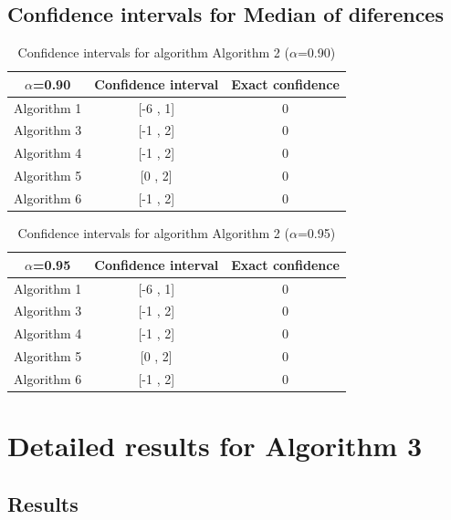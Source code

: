 \documentclass[a4paper,10pt]{article}
\begin{document}
\subsection{Confidence intervals for Median of diferences}

\begin{table}[!htp]
\centering\small
\begin{tabular}{
|c|c|c|}
\hline
 $\alpha$=0.90 & Confidence interval & Exact confidence \\ \hline 
Algorithm 1 & [-6 , 1] & 0\\ \hline 
Algorithm 3 & [-1 , 2] & 0\\ \hline 
Algorithm 4 & [-1 , 2] & 0\\ \hline 
Algorithm 5 & [0 , 2] & 0\\ \hline 
Algorithm 6 & [-1 , 2] & 0\\ \hline 

\end{tabular}
\caption{Confidence intervals for algorithm Algorithm 2 ($\alpha$=0.90)}
\end{table}
\begin{table}[!htp]
\centering\small
\begin{tabular}{
|c|c|c|}
\hline
 $\alpha$=0.95 & Confidence interval & Exact confidence \\ \hline 
Algorithm 1 & [-6 , 1] & 0\\ \hline 
Algorithm 3 & [-1 , 2] & 0\\ \hline 
Algorithm 4 & [-1 , 2] & 0\\ \hline 
Algorithm 5 & [0 , 2] & 0\\ \hline 
Algorithm 6 & [-1 , 2] & 0\\ \hline 

\end{tabular}
\caption{Confidence intervals for algorithm Algorithm 2 ($\alpha$=0.95)}
\end{table}

 \clearpage 


\section{Detailed results for Algorithm 3}


\subsection{Results}
\end{document}
